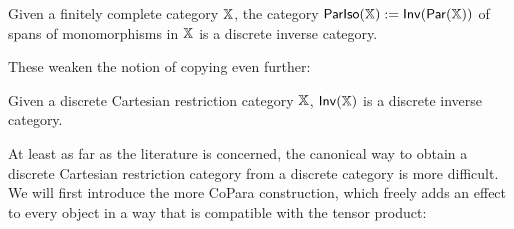 \begin{lemma}
\label{def:pariso}
Given a finitely complete category $\mathbb{X}$, the category  $\mathsf{ParIso}(\mathbb{X}):=\mathsf{Inv}(\mathsf{Par}(\mathbb{X}))$ of spans of monomorphisms in $\mathbb{X}$ is a discrete inverse category.
\end{lemma}
These weaken the notion of copying even further:
\begin{lemma}
Given a discrete Cartesian restriction category $\mathbb{X}$, $\mathsf{Inv}(\mathbb{X})$ is a discrete inverse category.
\end{lemma}
At least as far as the literature is concerned, the canonical way to obtain a discrete Cartesian restriction category from a discrete category is more difficult.  We will first introduce the more CoPara construction, which freely adds an effect to every object in a way that is compatible with the tensor product:
